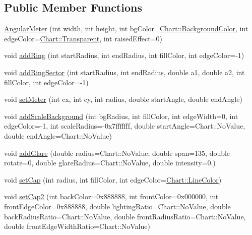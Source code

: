 \subsection*{Public Member Functions}
\begin{DoxyCompactItemize}
\item 
\hyperlink{class_angular_meter_a5d71988b332dcbe883e7ad8d5abc0696}{Angular\+Meter} (int width, int height, int bg\+Color=\hyperlink{namespace_chart_abee0d882fdc9ad0b001245ad9fc64011a134193bde693b9d152d0c6dc59fa7d7f}{Chart\+::\+Background\+Color}, int edge\+Color=\hyperlink{namespace_chart_abee0d882fdc9ad0b001245ad9fc64011afc6811800a9e2582dac0157b6279f836}{Chart\+::\+Transparent}, int raised\+Effect=0)
\item 
void \hyperlink{class_angular_meter_a67b26ec28b68cac7b13922d61d2a36c9}{add\+Ring} (int start\+Radius, int end\+Radius, int fill\+Color, int edge\+Color=-\/1)
\item 
void \hyperlink{class_angular_meter_af7d1c8c5d188a2cf63a08296228fd6c3}{add\+Ring\+Sector} (int start\+Radius, int end\+Radius, double a1, double a2, int fill\+Color, int edge\+Color=-\/1)
\item 
void \hyperlink{class_angular_meter_a569e2ac4b396f2c1cafb5943f390c454}{set\+Meter} (int cx, int cy, int radius, double start\+Angle, double end\+Angle)
\item 
void \hyperlink{class_angular_meter_a1de741912b6b62a24f7d197b4717e4b6}{add\+Scale\+Background} (int bg\+Radius, int fill\+Color, int edge\+Width=0, int edge\+Color=-\/1, int scale\+Radius=-\/0x7fffffff, double start\+Angle=\+Chart\+::\+No\+Value, double end\+Angle=\+Chart\+::\+No\+Value)
\item 
void \hyperlink{class_angular_meter_ade95bcd716c78e650ab625c3b6c0fa0c}{add\+Glare} (double radius=Chart\+::\+No\+Value, double span=135, double rotate=0, double glare\+Radius=Chart\+::\+No\+Value, double intensity=0.)
\item 
void \hyperlink{class_angular_meter_a0e20598329d17a1ac23b73fea207a6b7}{set\+Cap} (int radius, int fill\+Color, int edge\+Color=\hyperlink{namespace_chart_abee0d882fdc9ad0b001245ad9fc64011a04817a359476e87a5c572a7a69cdaaec}{Chart\+::\+Line\+Color})
\item 
void \hyperlink{class_angular_meter_a80b2f6a0dea2b4968ef7cca433e85a1d}{set\+Cap2} (int back\+Color=0x888888, int front\+Color=0x000000, int front\+Edge\+Color=0x888888, double lighting\+Ratio=\+Chart\+::\+No\+Value, double back\+Radius\+Ratio=\+Chart\+::\+No\+Value, double front\+Radius\+Ratio=\+Chart\+::\+No\+Value, double front\+Edge\+Width\+Ratio=\+Chart\+::\+No\+Value)

\end{DoxyCompactItemize}
